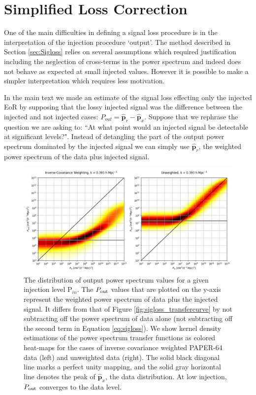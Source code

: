 \documentclass[preprint2,numberedappendix,tighten]{aastex6}  %
\begin{document}
\section{Simplified Loss Correction}
\label{sec:Pr_appendix}
One of the main difficulties in defining a signal loss procedure is in the interpretation of the injection procedure `output'. The method described in Section \ref{sec:Sigloss} relies on several assumptions which required justification including the neglection of cross-terms in the power spectrum and indeed does not behave as expected at small injected values. However it is possible to make a simpler interpretation which requires less motivation.

In the main text we made an estimate of the signal loss effecting only the injected EoR by supposing that the lossy injected signal was the difference between the injected and not injected cases: $P_{out} = \hat{\textbf{p}}_{r} - \hat{\textbf{p}}_{x}$. Suppose that we rephrase the question we are asking to: ``At what point would an injected signal be detectable at significant levels?". Instead of detangling the part of the output power spectrum dominated by the injected signal we can simply use $\hat{\textbf{p}}_{r}$, the weighted power spectrum of the data plus injected signal.
  
\begin{figure}[tp]
\centering
\includegraphics[width=\textwidth]{plots/method2_heatmap_I.png}
\caption{The distribution of output power spectrum values for a 
given injection level P$_{in}$. The $P_{\rm out}$ values that are plotted on the y-axis represent the weighted power spectrum of data plus the injected signal. It differs from that of Figure \ref{fig:sigloss_transfercurve} by not subtracting off the power spectrum of data alone (not subtracting off the second term in Equation \eqref{eq:sigloss}). We show kernel density estimations of the power spectrum transfer functions as colored heat-maps for the cases of inverse covariance weighted PAPER-64 data (left) and unweighted data (right). The solid black 
diagonal line marks a perfect unity mapping, and the solid gray horizontal line denotes the peak of $\hat{\textbf{p}}_{x}$, the data distribution. At low injection, $P_{\rm out}$ converges to the data level.}
\label{fig:Pr_vs_Pin}
\end{figure}  
  
\end{document}
